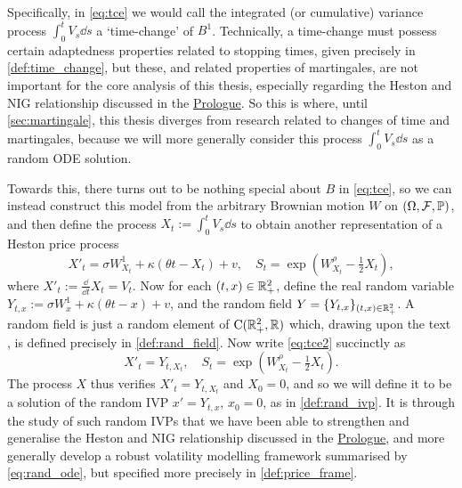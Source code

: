Specifically, in \autoref{eq:tce} we would call the integrated (or cumulative) variance process $\int_0^t V_s\dd s$ a `time-change' of $B^1$. Technically, a time-change must possess certain adaptedness properties related to stopping times, given precisely in \autoref{def:time_change}, but these, and related properties of martingales, are not important for the core analysis of this thesis, especially regarding the Heston and NIG relationship discussed in the \hyperlink{prologue}{Prologue}. So this is where, until \autoref{sec:martingale}, this thesis diverges from research related to changes of time and martingales, because we will more generally consider this process $\int_0^t V_s\dd s$ as a random ODE solution.

Towards this, there turns out to be nothing special about $B$ in \autoref{eq:tce}, so we can instead construct this model from the arbitrary Brownian motion $W$ on $(\Omega,\mathcal{F},\mathbb{P})$, and then define the process $X_t:=\int_0^t V_s\dd s$ to obtain another representation of a Heston price process
\begin{equation}\label{eq:tce2}
    X'_t = \sigma W^1_{X_t} + \kappa\left(\theta t - X_t\right) + v,\quad S_t = \exp\left(W^\rho_{X_t} - \tfrac12 X_t\right),
\end{equation}
where $X'_t:=\frac{\dd}{\dd t}X_t = V_t$. Now for each $(t,x)\in\mathbb{R}^2_+$, define the real random variable $Y_{t,x}:= \sigma W^1_x + \kappa\left(\theta t - x\right) + v$, and the random field $Y=\{Y_{t,x}\}_{(t,x)\in\mathbb{R}_+^2}$. A random field is just a random element of $\mathrm{C}(\mathbb{R}^2_+,\mathbb{R})$ which, drawing upon the text \cite{barndorff-nielsen_2018}, is defined precisely in \autoref{def:rand_field}. Now write \autoref{eq:tce2} succinctly as
\begin{equation}\label{eq:rand_ode}
    X'_t = Y_{t,X_t},\quad S_t = \exp\left(W^\rho_{X_t} - \tfrac12 X_t\right).
\end{equation}
The process $X$ thus verifies $X'_t=Y_{t,X_t}$ and $X_0=0$, and so we will define it to be a solution of the random IVP $x'=Y_{t,x}$, $x_0=0$, as in \autoref{def:rand_ivp}. It is through the study of such random IVPs that we have been able to strengthen and generalise the Heston and NIG relationship discussed in the \hyperlink{prologue}{Prologue}, and more generally develop a robust volatility modelling framework summarised by \autoref{eq:rand_ode}, but specified more precisely in \autoref{def:price_frame}.

